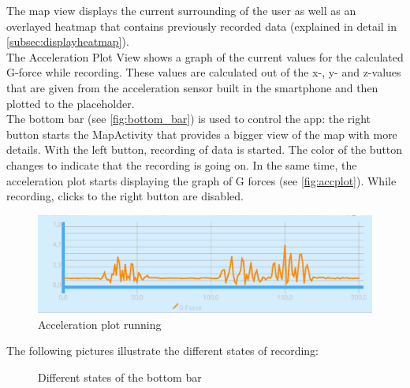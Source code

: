 \documentclass[10pt,a4paper]{article} %
\begin{document}
	The map view displays the current surrounding of the user as well as an overlayed heatmap that contains previously recorded data (explained in detail in \autoref{subsec:displayheatmap}).\\
	The Acceleration Plot View shows a graph of the current values for the calculated G-force while recording. 
	These values are calculated out of the x-, y- and z-values that are given from the acceleration sensor built in the smartphone and then plotted to the placeholder.\\
	The bottom bar (see \autoref{fig:bottom_bar}) is used to control the app: the right button starts the MapActivity that provides a bigger view of the map with more details.
	With the left button, recording of data is started. 
	The color of the button changes to indicate that the recording is going on.
	In the same time, the acceleration plot starts displaying the graph of G forces (see \autoref{fig:accplot}).
	While recording, clicks to the right button are disabled.\\
	
	\begin{figure}[h]
		\begin{center}
 		  \includegraphics[scale=0.4]{img/acc_plot.png}
		  \caption{Acceleration plot running}
		  \label{fig:accplot}
		\end{center}
	\end{figure}

The following pictures illustrate the different states of recording:


	\begin{figure}[h]
	  \centering
	  \hfill
	  \caption{Different states of the bottom bar}
	  \label{fig:bottom_bar}
	\end{figure}
\end{document}
